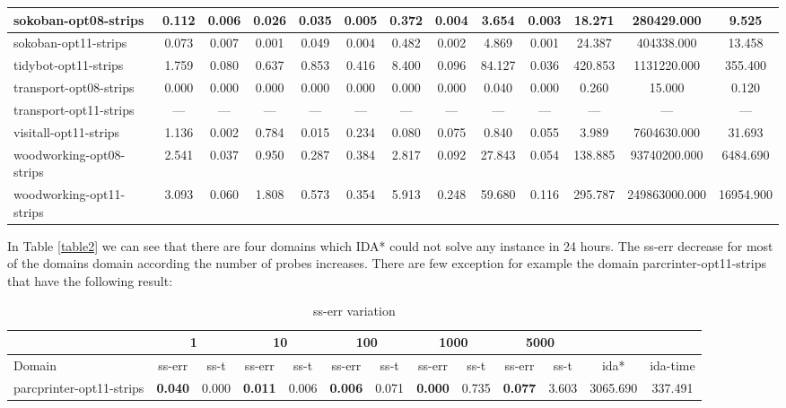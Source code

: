 \documentclass[a4paper,12pt]{article}
\begin{document}
\begin{table}[]
\begin{tabular}{l@{\hspace{4pt}} *{12}{c}}
sokoban-opt08-strips    & 0.112 & 0.006 & 0.026 & 0.035 & 0.005 & 0.372 & 0.004 & 3.654 & 0.003 & 18.271 & 280429.000 & 9.525 \\ \hline
sokoban-opt11-strips    & 0.073 & 0.007 & 0.001 & 0.049 & 0.004 & 0.482 & 0.002 & 4.869 & 0.001 & 24.387 & 404338.000 & 13.458 \\ \hline
tidybot-opt11-strips    & 1.759 & 0.080 & 0.637 & 0.853 & 0.416 & 8.400 & 0.096 & 84.127 & 0.036 & 420.853 & 1131220.000 & 355.400 \\ \hline
transport-opt08-strips  & 0.000 & 0.000 & 0.000 & 0.000 & 0.000 & 0.000 & 0.000 & 0.040 & 0.000 & 0.260 & 15.000 & 0.120 \\ \hline
transport-opt11-strips  & --- & --- & --- & --- & --- & --- & --- & --- & --- & --- & --- & --- \\ \hline
visitall-opt11-strips   & 1.136 & 0.002 & 0.784 & 0.015 & 0.234 & 0.080 & 0.075 & 0.840 & 0.055 & 3.989 & 7604630.000 & 31.693 \\ \hline
woodworking-opt08-strips& 2.541 & 0.037 & 0.950 & 0.287 & 0.384 & 2.817 & 0.092 & 27.843 & 0.054 & 138.885 & 93740200.000 & 6484.690 \\ \hline
woodworking-opt11-strips& 3.093 & 0.060 & 1.808 & 0.573 & 0.354 & 5.913 & 0.248 & 59.680 & 0.116 & 295.787 & 249863000.000 & 16954.900 \\ \hline
\end{tabular}
\end{table}

In Table \ref{table2} we can see that there are four domains which IDA* could not solve any instance in 24 hours. The ss-err decrease for most of the domains domain according the number of probes increases. There are few exception for example the domain parcrinter-opt11-strips that have the following result:

\begin{table}[]
\footnotesize\setlength{\tabcolsep}{2.4pt}
\caption{ss-err variation}
\label{subTable2}
\begin{tabular}{l@{\hspace{6pt}} *{12}{c}}
\hline
                         & \multicolumn{2}{|c|}{1} & \multicolumn{2}{c|}{10} & \multicolumn{2}{c|}{100} & \multicolumn{2}{c|}{1000} & \multicolumn{2}{c|}{5000} &          &          \\ \hline
Domain                   & ss-err     & ss-t      & ss-err      & ss-t      & ss-err      & ss-t       & ss-err       & ss-t       & ss-err       & ss-t       & ida*     & ida-time \\ \hline
parcprinter-opt11-strips & \textbf{0.040}      & 0.000     & \textbf{0.011}       & 0.006     & \textbf{0.006}       & 0.071      & \textbf{0.000}        & 0.735      & \textbf{0.077}        & 3.603      & 3065.690 & 337.491  \\ \hline
\end{tabular}
\end{table}
\end{document}
